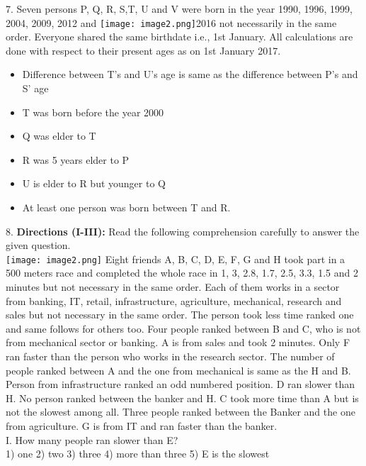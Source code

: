 \documentclass[
]{article}
\begin{document}
7. Seven persons P, Q, R, S,T, U and V were born in the year 1990, 1996, 1999, 2004, 2009, 2012
and \texttt{[image: image2.png]}2016 not necessarily in the same order. Everyone shared the same birthdate i.e., 1st
January. All calculations are done with respect to their present ages as on 1st January 2017.\\
\begin{itemize}
\item Difference between T’s and U’s age is same as the difference between P’s and S’ age
\item T was born before the year 2000\\
\item Q was elder to T\\
\item R was 5 years elder to P\\
\item U is elder to R but younger to Q\\
\item At least one person was born between T and R.\\
\end{itemize}


8. \textbf{Directions (I-III):} Read the following comprehension carefully to answer the given question.\\
\texttt{[image: image2.png]}
Eight friends A, B, C, D, E, F, G and H took part in a 500 meters race and completed the whole
race in 1, 3, 2.8, 1.7, 2.5, 3.3, 1.5 and 2 minutes but not necessary in the same order. Each of
them works in a sector from banking, IT, retail, infrastructure, agriculture, mechanical,
research and sales but not necessary in the same order. The person took less time ranked one
and same follows for others too.
Four people ranked between B and C, who is not from mechanical sector or banking. A is
from sales and took 2 minutes. Only F ran faster than the person who works in the research
sector. The number of people ranked between A and the one from mechanical is same as the
H and B. Person from infrastructure ranked an odd numbered position. D ran slower than H.
No person ranked between the banker and H. C took more time than A but is not the slowest
among all. Three people ranked between the Banker and the one from agriculture. G is from
IT and ran faster than the banker.\\

I. How many people ran slower than E?\\
1) one \hspace{2mm}2) two \hspace{2mm}3) three
\hspace{2mm}4) more than three \hspace{2mm}5) E is the slowest\\
\end{document}
